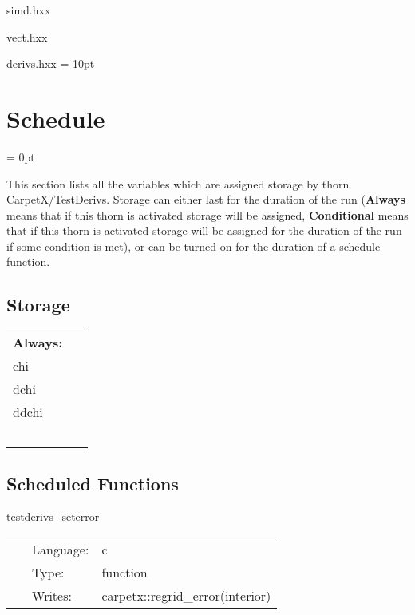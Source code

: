 simd.hxx

vect.hxx

derivs.hxx
\vspace{2mm}\parskip = 10pt 

\section{Schedule} 


\parskip = 0pt


\noindent This section lists all the variables which are assigned storage by thorn CarpetX/TestDerivs.  Storage can either last for the duration of the run ({\bf Always} means that if this thorn is activated storage will be assigned, {\bf Conditional} means that if this thorn is activated storage will be assigned for the duration of the run if some condition is met), or can be turned on for the duration of a schedule function.


\subsection*{Storage}

\hspace{5mm}

 \begin{tabular*}{160mm}{ll} 

{\bf Always:}&  ~ \\ 
 chi & ~\\ 
 dchi & ~\\ 
 ddchi & ~\\ 
~ & ~\\ 
\end{tabular*} 


\subsection*{Scheduled Functions}
\vspace{5mm}


\hspace{5mm} testderivs\_seterror 

\hspace{5mm}{\it set up test grid } 


\hspace{5mm}

 \begin{tabular*}{160mm}{cll} 
~ & Language:  & c \\ 
~ & Type:  & function \\ 
~ & Writes:  & carpetx::regrid\_error(interior) \\ 
\end{tabular*} 


